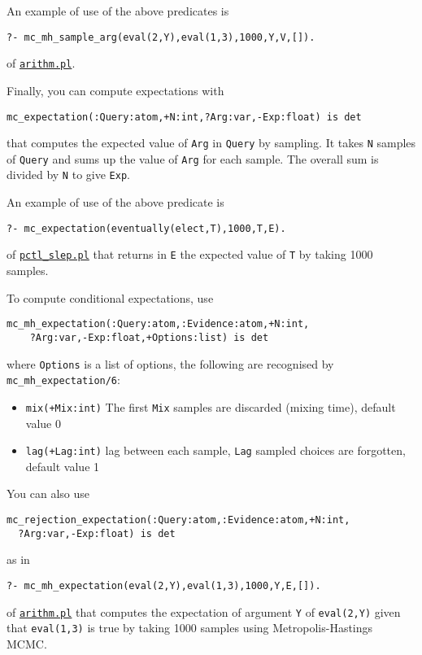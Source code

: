 An example of use of the above predicates is
\begin{verbatim}
?- mc_mh_sample_arg(eval(2,Y),eval(1,3),1000,Y,V,[]).
\end{verbatim}
of \href{http://cplint.eu/example/inference/arithm.pl}{\texttt{arithm.pl}}.

Finally, you can compute expectations with
\begin{verbatim}
mc_expectation(:Query:atom,+N:int,?Arg:var,-Exp:float) is det
\end{verbatim}
that computes the expected value of \verb|Arg| in \verb|Query| by
sampling.
It takes \verb|N| samples of \verb|Query| and sums up the value of \verb|Arg| for
each sample. The overall sum is divided by \verb|N| to give \verb|Exp|.

An example of use of the above predicate is
\begin{verbatim}
?- mc_expectation(eventually(elect,T),1000,T,E).
\end{verbatim}
of \href{http://cplint.eu/example/inference/pctl_slep.pl}{\texttt{pctl\_slep.pl}}
that returns in \verb|E| the expected value of \verb|T| by taking 1000 samples.

To compute conditional expectations, use
\begin{verbatim}
mc_mh_expectation(:Query:atom,:Evidence:atom,+N:int,
	?Arg:var,-Exp:float,+Options:list) is det
\end{verbatim}
where \verb|Options| is a list of options, the following are recognised by \verb|mc_mh_expectation/6|:
\begin{itemize}
\item \verb|mix(+Mix:int)|
The first  \verb|Mix| samples are discarded (mixing time), default value 0
\item \verb|lag(+Lag:int)|
lag between each sample, \verb|Lag| sampled choices are forgotten, default value 1
\end{itemize}
You can also use
\begin{verbatim}
mc_rejection_expectation(:Query:atom,:Evidence:atom,+N:int,
  ?Arg:var,-Exp:float) is det
\end{verbatim}
as in
\begin{verbatim}
?- mc_mh_expectation(eval(2,Y),eval(1,3),1000,Y,E,[]).
\end{verbatim}
of \href{http://cplint.eu/example/inference/arithm.pl}{\texttt{arithm.pl}}
that computes the expectation of argument \verb|Y| of \verb|eval(2,Y)| given that
\verb|eval(1,3)| is true by taking 1000 samples using Metropolis-Hastings MCMC.

